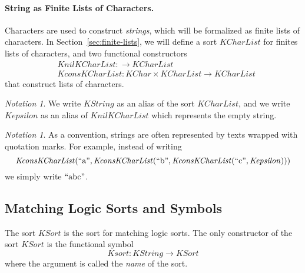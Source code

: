 \documentclass[UTF8,11pt]{article}
\newcounter{thmcounter}
\theoremstyle{plain}
\theoremstyle{definition}
\theoremstyle{remark}
\newtheorem{notation}   [thmcounter]{Notation}
\newcommand{\KChar}{\mathit{KChar}}
\newcommand{\KCharList}{\mathit{KCharList}}
\newcommand{\KString}{\mathit{KString}}
\newcommand{\Kepsilon}{\mathit{Kepsilon}}
\newcommand{\KSort}{\mathit{KSort}}
\newcommand{\Ksort}{\mathit{Ksort}}
\newcommand{\KnilKCharList}{\mathit{KnilKCharList}}
\newcommand{\KconsKCharList}{\mathit{KconsKCharList}}
\newcommand{\quot}[1]{\mathrm{``#1"}}
\begin{document}
\paragraph{String as Finite Lists of Characters.}\quad
Characters are used to construct \emph{strings}, which will be formalized as finite lists of characters.
In Section~\cref{sec:finite-lists}, we will define a sort $\KCharList$ for finites lists of characters, and two functional constructors
\begin{align*}
 & \KnilKCharList \colon \to \KCharList \\
 & \KconsKCharList \colon \KChar \times \KCharList \to \KCharList
\end{align*}
that construct lists of characters.

\begin{notation}
	We write $\KString$ as an alias of the sort $\KCharList$, and we write $\Kepsilon$ as an alias of $\KnilKCharList$ which represents the empty string.
\end{notation}

\begin{notation}
	As a convention, strings are often represented by texts wrapped with quotation marks. 
	For example, instead of writing
	$$
	\KconsKCharList(\quot{a}, \KconsKCharList(\quot{b}, \KconsKCharList(\quot{c}, \Kepsilon)))
	$$
	we simply write $\quot{abc}$.
\end{notation}

\subsection{Matching Logic Sorts and Symbols}
\label{sec:ML-sorts-symbols}

The sort $\KSort$ is the sort for matching logic sorts.
The only constructor of the sort $\KSort$ is the functional symbol
\begin{equation*}
\Ksort \colon \KString \to \KSort
\end{equation*}
where the argument is called the \emph{name} of the sort. 
\end{document}
